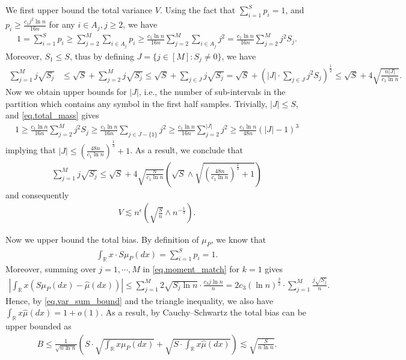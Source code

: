 \documentclass[final,12pt]{colt2018} %
\newcommand{\reals}{\mathbb{R}}
\begin{document}
We first upper bound the total variance $V$. Using the fact that $\sum_{i=1}^S p_i=1$, and $p_i\ge \frac{c_1j^2\ln n}{16n}$ for any $i\in A_j, j\ge 2$, we have
\begin{align}\label{eq.total_mass}
1 = \sum_{i=1}^S p_i \ge \sum_{j=2}^M \sum_{i\in A_j} p_i \ge \frac{c_1\ln n}{16n} \sum_{j=2}^M \sum_{i\in A_j}j^2 = \frac{c_1\ln n}{16n} \sum_{j=2}^M j^2S_j.
\end{align}
Moreover, $S_1\le S$, thus by defining $J=\{j\in [M]: S_j\neq 0\}$, we have
\begin{align*}
\sum_{j=1}^M j\sqrt{S_j} &\le \sqrt{S} + \sum_{j=2}^M j\sqrt{S_j} \le \sqrt{S} + \sum_{j\in J} j\sqrt{S_j} = \sqrt{S}+ \left(|J|\cdot \sum_{j\in J}j^2S_j\right)^{\frac{1}{2}} \le \sqrt{S} + 4\sqrt{\frac{{n|J|}}{{c_1\ln n}}}. 
\end{align*}
Now we obtain upper bounds for $|J|$, i.e., the number of sub-intervals in the partition which contains any symbol in the first half samples. Trivially, $|J|\le S$, and \eqref{eq.total_mass} gives
\begin{align*}
1 \ge \frac{c_1\ln n}{16n} \sum_{j=2}^M j^2S_j \ge \frac{c_1\ln n}{16n} \sum_{j\in J-\{1\}} j^2 \ge \frac{c_1\ln n}{16n}\sum_{j=2}^{|J|}j^2 \ge \frac{c_1\ln n}{48n} (|J|-1)^3
\end{align*}
implying that $|J|\le \left(\frac{48n}{c_1\ln n}\right)^{\frac{1}{3}}+1$. As a result, we conclude that
\begin{align}\label{eq.var_sum_bound}
\sum_{j=1}^M j\sqrt{S_j} \le \sqrt{S} + 4\sqrt{\frac{n}{c_1\ln n}} \left(\sqrt{S} \wedge \sqrt{\left(\frac{48n}{c_1\ln n}\right)^{\frac{1}{3}}+1} \right)
\end{align}
and consequently
\begin{align}\label{eq.total_var}
V \lesssim n^{\epsilon}\left(\sqrt{\frac{S}{n}} \wedge n^{-\frac{1}{3}}\right).
\end{align}

Now we upper bound the total bias. By definition of $\mu_P$, we know that
\begin{align*}
\int_{\reals} x\cdot S\mu_P(dx) = \sum_{i=1}^S p_i = 1.
\end{align*}
Moreover, summing over $j=1,\cdots,M$ in \eqref{eq.moment_match} for $k=1$ gives
\begin{align*}
\left|\int_{\mathbb{R}} x(S\mu_P(dx) - \hat{\mu}(dx)) \right| \le \sum_{j=1}^M 2\sqrt{S_j\ln n} \cdot\frac{c_3j\ln n}{n} = 2c_3(\ln n)^{\frac{3}{2}}\cdot \sum_{j=1}^M \frac{j\sqrt{S_j}}{n}.
\end{align*}
Hence, by \eqref{eq.var_sum_bound} and the triangle inequality, we also have $\int_{\mathbb{R}} x\hat{\mu}(dx) = 1+o(1)$. As a result, by Cauchy--Schwartz the total bias can be upper bounded as
\begin{align}\label{eq.total_bias}
B \le \frac{1}{\sqrt{n\ln n}}\left(S\cdot\sqrt{\int_{\reals} x\mu_P(dx)} + \sqrt{S\cdot\int_{\reals} x\hat{\mu}(dx)}\right) \lesssim \sqrt{\frac{S}{n\ln n}}.
\end{align}
\end{document}
